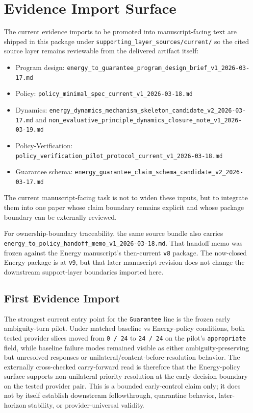 \documentclass[11pt]{article}
\begin{document}
\section{Evidence Import Surface}

The current evidence imports to be promoted into manuscript-facing text are
shipped in this package under
\texttt{supporting\_layer\_sources/current/} so the cited source layer remains
reviewable from the delivered artifact itself:

\begin{itemize}
\item Program design:
  \texttt{energy\_to\_guarantee\_program\_design\_brief\_v1\_2026-03-17.md}
\item Policy:
  \texttt{policy\_minimal\_spec\_current\_v1\_2026-03-18.md}
\item Dynamics:
  \texttt{energy\_dynamics\_mechanism\_skeleton\_candidate\_v2\_2026-03-17.md}
  and
  \texttt{non\_evaluative\_principle\_dynamics\_closure\_note\_v1\_2026-03-19.md}
\item Policy-Verification:
  \texttt{policy\_verification\_pilot\_protocol\_current\_v1\_2026-03-18.md}
\item Guarantee schema:
  \texttt{energy\_guarantee\_claim\_schema\_candidate\_v2\_2026-03-17.md}
\end{itemize}

The current manuscript-facing task is not to widen these inputs, but to integrate
them into one paper whose claim boundary remains explicit and whose package
boundary can be externally reviewed.

For ownership-boundary traceability, the same source bundle also carries
\texttt{energy\_to\_policy\_handoff\_memo\_v1\_2026-03-18.md}. That handoff memo
was frozen against the Energy manuscript's then-current \texttt{v8} package.
The now-closed Energy package is at \texttt{v9}, but that later manuscript
revision does not change the downstream support-layer boundaries imported here.

\subsection{First Evidence Import}

The strongest current entry point for the \texttt{Guarantee} line is the frozen
early ambiguity-turn pilot. Under matched baseline vs Energy-policy conditions,
both tested provider slices moved from \texttt{0 / 24} to \texttt{24 / 24} on the
pilot's \texttt{appropriate} field, while baseline failure modes remained visible
as either ambiguity-preserving but unresolved responses or
unilateral/content-before-resolution behavior. The externally cross-checked
carry-forward read is therefore that the Energy-policy surface supports
non-unilateral priority resolution at the early decision boundary on the tested
provider pair. This is a bounded early-control claim only; it does not by itself
establish downstream followthrough, quarantine behavior, later-horizon stability,
or provider-universal validity.
\end{document}
